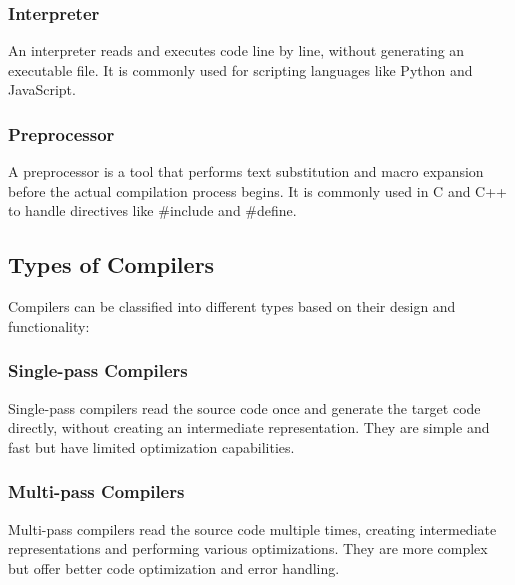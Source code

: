 \documentclass[12pt]{article}
\begin{document}

\subsubsection*{Interpreter}
An interpreter reads and executes code line by line, without generating an executable file. It is commonly used for scripting languages like Python and JavaScript.


\subsubsection*{Preprocessor}
A preprocessor is a tool that performs text substitution and macro expansion before the actual compilation process begins. It is commonly used in C and C++ to handle directives like \#include and \#define.


\subsection*{Types of Compilers}
Compilers can be classified into different types based on their design and functionality:

\subsubsection*{Single-pass Compilers}
Single-pass compilers read the source code once and generate the target code directly, without creating an intermediate representation. They are simple and fast but have limited optimization capabilities.

\subsubsection*{Multi-pass Compilers}
Multi-pass compilers read the source code multiple times, creating intermediate representations and performing various optimizations. They are more complex but offer better code optimization and error handling.
\end{document}

